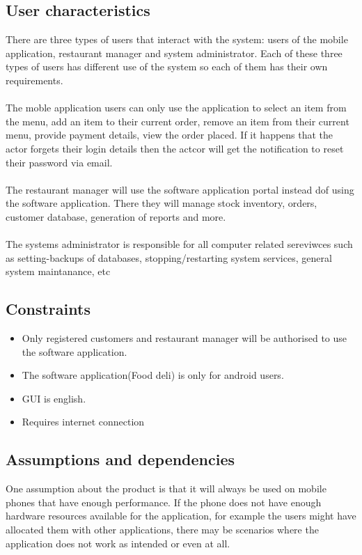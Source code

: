 \documentclass[12pt]{article}
\begin{document}
\subsection{User characteristics}
There are three types of users that interact with the system: users of the mobile application, restaurant manager and system administrator. Each of these three types of users has different use of the system so each of them has their own requirements.\\
\\
The moble application users can only use the application to select an item from the menu, add an item to their current order, remove an item from their current menu, provide payment details, view the order placed. If it happens that the actor forgets their login details then the actcor will get the notification to reset their password via email.\\
\\
The restaurant manager will use the software application portal instead dof using the software application. There they will manage stock inventory, orders, customer database, generation of reports and more.\\
\\
The systems administrator is responsible for all computer related sereviwces such as setting-backups of databases, stopping/restarting system services, general system maintanance, etc

\subsection{Constraints}
 \begin{itemize}
	\item Only registered customers and restaurant manager will be authorised to use the software application.
	\item The software application(Food deli) is only for android users.
	\item GUI is english.
	\item Requires internet connection
 \end{itemize}
\subsection{Assumptions and dependencies}
One assumption about the product is that it will always be used on mobile phones that have enough performance. If the phone does not have enough hardware resources available for the application, for example the users might have allocated them with other applications, there may be scenarios where the application does not work as intended or even at all.
\end{document}
